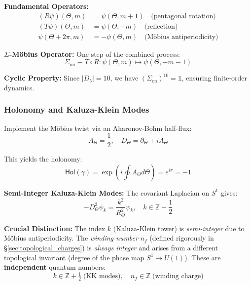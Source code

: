 \documentclass[12pt]{article}
\begin{document}
\textbf{Fundamental Operators:}
\begin{align}
(R\psi)(\Theta, m) &= \psi(\Theta, m+1) \quad \text{(pentagonal rotation)} \\
(T\psi)(\Theta, m) &= \psi(\Theta, -m) \quad \text{(reflection)} \\
\psi(\Theta + 2\pi, m) &= -\psi(\Theta, m) \quad \text{(M\"obius antiperiodicity)}
\end{align}

\textbf{$\Sigma$-M\"obius Operator:} One step of the combined process:
\begin{equation}
\boxed{\Sigma_{\text{on}} \equiv T \circ R : \psi(\Theta, m) \mapsto \psi(\Theta, -m-1)}
\end{equation}

\textbf{Cyclic Property:} Since $|D_5| = 10$, we have $(\Sigma_{\text{on}})^{10} = \mathbb{1}$, ensuring finite-order dynamics.

\subsubsection{Holonomy and Kaluza-Klein Modes}

Implement the M\"obius twist via an Aharonov-Bohm half-flux:
\begin{equation}
A_\Theta = \frac{1}{2}, \quad D_\Theta = \partial_\Theta + iA_\Theta
\end{equation}

This yields the holonomy:
\begin{equation}
\mathsf{Hol}(\gamma) = \exp\left(i \oint A_\Theta d\Theta\right) = e^{i\pi} = -1
\end{equation}

\textbf{Semi-Integer Kaluza-Klein Modes:} The covariant Laplacian on $S^1$ gives:
\begin{equation}
-D_\Theta^2 \psi_k = \frac{k^2}{R_\Theta^2} \psi_k, \quad k \in \mathbb{Z} + \frac{1}{2}
\end{equation}

\textbf{Crucial Distinction:} The index $k$ (Kaluza-Klein tower) is \emph{semi-integer} due to M\"obius antiperiodicity. The \emph{winding number} $n_f$ (defined rigorously in \S\ref{sec:topological_charges}) is \emph{always integer} and arises from a different topological invariant (degree of the phase map $S^1 \to U(1)$). These are \textbf{independent} quantum numbers:
\begin{equation}
\boxed{k \in \mathbb{Z} + \tfrac{1}{2} \;\text{(KK modes)}, \quad n_f \in \mathbb{Z} \;\text{(winding charge)}}
\end{equation}
\end{document}
